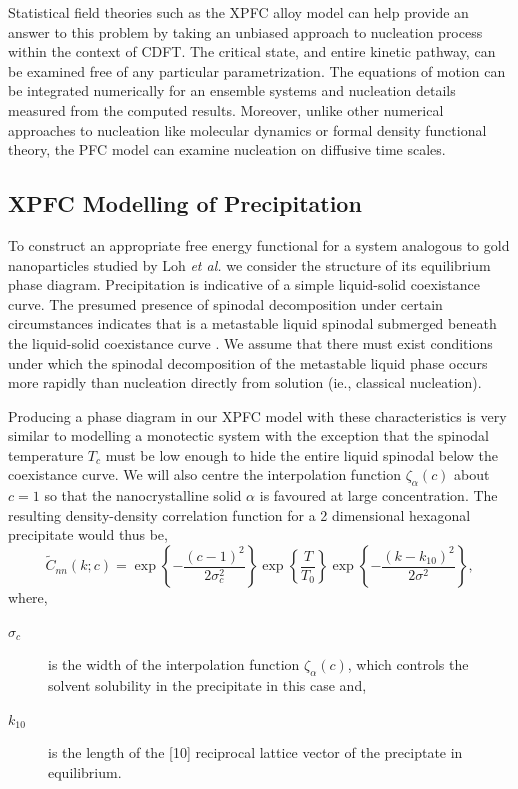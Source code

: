 \documentclass[showkeys, prb, reprint]{revtex4-1}
\renewcommand{\l}{\left}        %
\renewcommand{\r}{\right}       %
\newcommand{\f}{\frac}          %
\begin{document}

Statistical field theories such as the XPFC alloy model can help provide an
answer to this problem by taking an unbiased approach to nucleation process
within the context of CDFT.  The critical state, and entire kinetic pathway,
can be examined free of any particular parametrization. The equations of motion
can be integrated numerically for an ensemble systems and nucleation details
measured from the computed results.  Moreover, unlike other numerical
approaches to nucleation like molecular dynamics or formal density functional
theory, the PFC model can examine nucleation on diffusive time scales.

\subsection{XPFC Modelling of Precipitation} %


To construct an appropriate free energy functional for a system analogous to
gold nanoparticles studied by Loh \textit{et al.} \cite{LOH17} we consider the
structure of its equilibrium phase diagram. Precipitation is indicative of a
simple liquid-solid coexistance curve. The presumed presence of spinodal
decomposition under certain circumstances indicates that is a metastable liquid
spinodal submerged beneath the liquid-solid coexistance curve \cite{DAVEY13}.
We assume that there must exist conditions under which the spinodal
decomposition of the metastable liquid phase occurs more rapidly than
nucleation directly from solution (ie., classical nucleation).


Producing a phase diagram in our XPFC model with these characteristics is very
similar to modelling a monotectic system with the exception that the spinodal
temperature $T_c$ must be low enough to hide the entire liquid spinodal below
the coexistance curve.  We will also centre the interpolation function
$\zeta_\alpha(c)$ about $c = 1$ so that the nanocrystalline solid $\alpha$ is
favoured at large concentration. The resulting density-density correlation
function for a 2 dimensional hexagonal precipitate would thus be,
%
\begin{equation}
    \label{eq:precip_corr}
    \tilde{C}_{nn}(k; c) = \exp\l\lbrace - \f{(c - 1)^2}{2\sigma_c^2}\r\rbrace
        \exp\l\lbrace \f{T}{T_0} \r\rbrace 
        \exp\l\lbrace - \f{(k - k_{10})^2}{2\sigma^2} \r\rbrace,
\end{equation}
%
where,
\begin{description}
    \item[$\sigma_c$] is the width of the interpolation function
        $\zeta_\alpha(c)$, which controls the solvent solubility in the
        precipitate in this case and,
    \item[$k_{10}$] is the length of the [10] reciprocal lattice vector of the
        preciptate in equilibrium.
\end{description}
\end{document}
